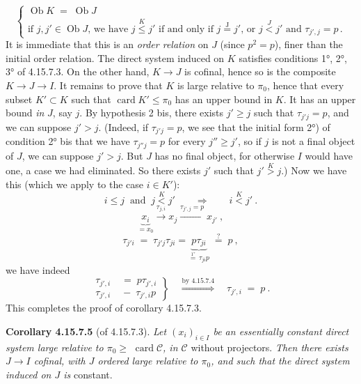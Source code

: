 \documentclass[11pt]{article}
\newcommand{\printedpage}[1]{\marginpar{\footnotesize p.~#1}}
\newcommand{\msp}[1]{\marginpar{\footnotesize [#1]}}
\newcommand{\cC}{\mathcal{C}}
\newcommand{\Ob}{\operatorname{Ob}}
\newcommand{\card}{\operatorname{card}}
\begin{document}
\msp{page 447}
\[
\begin{cases}
\Ob K \;=\; \Ob J \\
\text{if } j,j' \in \Ob J\text{, we have } j \overset{K}{\leqslant} j' \text{ if and only if } j \overset{\mathrm{J}}{=} j'\text{, or } j \overset{J}{<} j' \text{ and } \tau_{j',j} = p\,.
\end{cases}
\]
It is immediate that this is an \textit{order relation} on $J$ (since $p^2 = p$), finer than the initial order relation. The direct system induced on $K$ satisfies conditions 1°, 2°, 3° of 4.15.7.3. On the other hand, $K \longrightarrow J$ is cofinal, hence so is the composite $K \longrightarrow J \longrightarrow I$. It remains to prove that $K$ is large relative to $\pi_0$, hence that every subset $K' \subset K$ such that $\card K' \leqslant \pi_0$ has an upper bound in $K$. It has an upper bound \textit{in} $J$, say $j$. By hypothesis 2 bis, there exists $j' \geqslant j$ such that $\tau_{j'j} = p$, and we can suppose $j' > j$. (Indeed, if $\tau_{j'j} = p$, we see that
\printedpage{172}
\msp{page 448}
the initial form 2°) of condition 2° bis that we have $\tau_{j''j} = p$ for every $j'' \geqslant j'$, so if $j$ is not a final object of $J$, %
we can suppose $j' > j$. But $J$ has no final object, for otherwise $I$ would have one, a case we had eliminated. So there exists $j'$ such that $j' \overset{K}{>} j$.) Now we have this (which we apply to the case $i \in K'$):
\[
i \leqslant j \ \text{ and } \ j \overset{K}{<} j' \qquad \Longrightarrow \qquad i \overset{K}{<} j'\ .
\]
\[
\underbrace{x_i}_{= x_0} \xrightarrow{\tau_{j,i}} x_j \xrightarrow{\tau_{j',j}=p} x_{j'}\ ,
\]
\[
\tau_{j'i} \;=\; \tau_{j'j}\tau_{ji} = \underbrace{p\tau_{ji}}_{\overset{\text{1°}}{=}\,\tau_{ji}p} \;\overset{?}{=}\; p\ ,
\]
we have indeed
\[
\left.
\begin{aligned}
\tau_{j',i} &\;=\; p\tau_{j',i} \\
\tau_{j',i} &\;-\; \tau_{j',i}p %
\end{aligned}
\right\}
\quad \overset{\text{by 4.15.7.4}}{\Longrightarrow} \quad %
\tau_{j',i} \;=\; p\ .
\]
This completes the proof of corollary 4.15.7.3.

\textbf{Corollary 4.15.7.5} (of 4.15.7.3). \textit{Let $(x_i)_{i\in I}$ be an essentially constant direct system large relative to $\pi_0 \geqslant$} $\card\cC$\textit{, in $\cC$} without projectors. \textit{Then there exists $J \longrightarrow I$ cofinal, with $J$ ordered large relative to $\pi_0$, and such that the direct system induced on $J$ is} constant.
\end{document}
